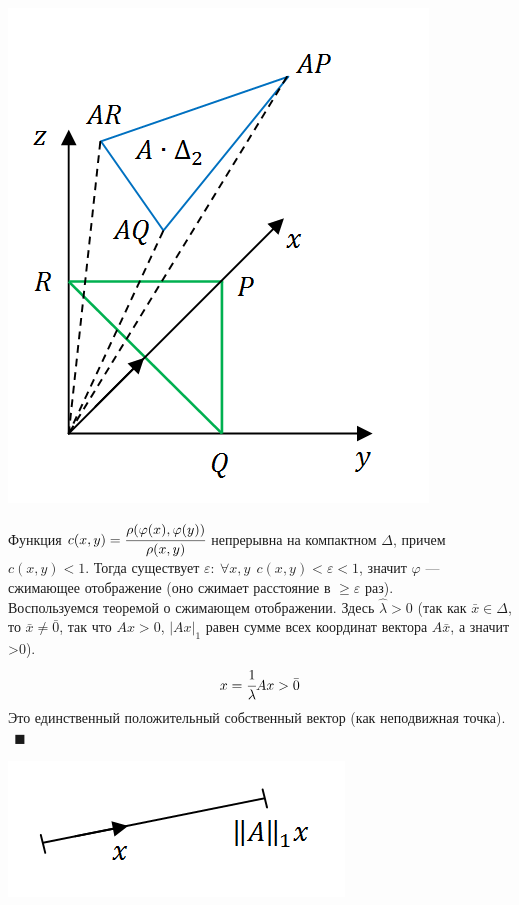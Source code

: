 \documentclass[12pt]{article}
\theoremstyle{definition}
\numberwithin{equation}{section}
\begin{document}
	\begin{center}
		\includegraphics[scale=0.8]{l15_3.png}\\
	\end{center}
	Функция $c(x, y)=\cfrac{\rho(\varphi(x), \varphi(y))}{\rho(x, y)}$ непрерывна на компактном $\Delta$, причем $c(x, y)<1$. Тогда существует $\varepsilon:~\forall x, y~~c(x, y)<\varepsilon<1$, значит $\varphi$ --- сжимающее отображение (оно сжимает расстояние в $\geqslant \varepsilon$ раз).\\
	Воспользуемся теоремой о сжимающем отображении. Здесь $\hat \lambda>0$ (так как $\bar x\in \Delta$, то $\bar x\neq \bar 0$, так что $Ax>0$, $|Ax|_1$ равен сумме всех координат вектора $A\bar x$, а значит >0).\\
	$$x=\cfrac{1}{\lambda}Ax>\bar 0$$
	Это единственный положительный собственный вектор (как неподвижная точка).$~~\blacksquare$\\
	\begin{center}
		\includegraphics[scale=0.8]{l15_4.png}\\
	\end{center}
\end{document}
